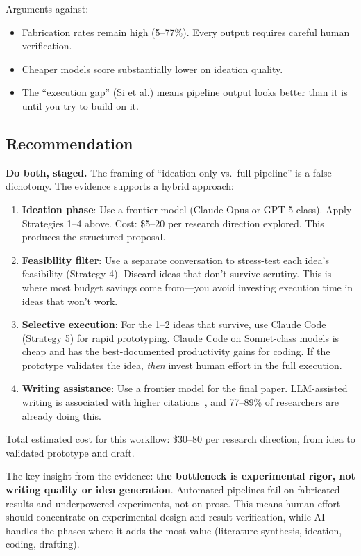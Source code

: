 \documentclass[11pt,a4paper]{article}
\begin{document}
Arguments against:
\begin{itemize}
\item Fabrication rates remain high (5--77\%). Every output requires careful human verification.
\item Cheaper models score substantially lower on ideation quality.
\item The ``execution gap'' (Si et al.) means pipeline output looks better than it is until you try to build on it.
\end{itemize}

\subsection{Recommendation}

\textbf{Do both, staged.} The framing of ``ideation-only vs.\ full pipeline'' is a false dichotomy. The evidence supports a hybrid approach:

\begin{enumerate}
\item \textbf{Ideation phase}: Use a frontier model (Claude Opus or GPT-5-class). Apply Strategies 1--4 above. Cost: \$5--20 per research direction explored. This produces the structured proposal.

\item \textbf{Feasibility filter}: Use a separate conversation to stress-test each idea's feasibility (Strategy 4). Discard ideas that don't survive scrutiny. This is where most budget savings come from---you avoid investing execution time in ideas that won't work.

\item \textbf{Selective execution}: For the 1--2 ideas that survive, use Claude Code (Strategy 5) for rapid prototyping. Claude Code on Sonnet-class models is cheap and has the best-documented productivity gains for coding. If the prototype validates the idea, \emph{then} invest human effort in the full execution.

\item \textbf{Writing assistance}: Use a frontier model for the final paper. LLM-assisted writing is associated with higher citations~\cite{jinformatics2026}, and 77--89\% of researchers are already doing this.
\end{enumerate}

Total estimated cost for this workflow: \$30--80 per research direction, from idea to validated prototype and draft.

The key insight from the evidence: \textbf{the bottleneck is experimental rigor, not writing quality or idea generation}. Automated pipelines fail on fabricated results and underpowered experiments, not on prose. This means human effort should concentrate on experimental design and result verification, while AI handles the phases where it adds the most value (literature synthesis, ideation, coding, drafting).
\end{document}
